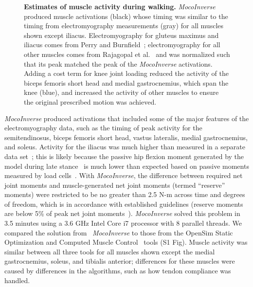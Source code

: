 \documentclass[10pt,letterpaper]{article}
\begin{document}
\begin{figure}[!h]
    \centering
    \caption{{\bf Estimates of muscle activity during walking.}
        \textit{MocoInverse} produced muscle activations (black) whose timing was similar to the timing from electromyography measurements (gray) for all muscles shown except iliacus. Electromyography for gluteus maximus and iliacus comes from Perry and Burnfield~\cite{Perry:2010}; electromyography for all other muscles comes from Rajagopal et al.~\cite{Rajagopal:2016ek} and was normalized such that its peak matched the peak of the \textit{MocoInverse} activations. Adding a cost term for knee joint loading reduced the activity of the biceps femoris short head and medial gastrocnemius, which span the knee (blue), and increased the activity of other muscles to ensure the original prescribed motion was achieved.
    }
    \label{walking}
\end{figure}

\textit{MocoInverse} produced activations that included some of the major features of the electromyography data, such as the timing of peak activity for the semitendinosus, biceps femoris short head, vastus lateralis, medial gastrocnemius, and soleus. Activity for the iliacus was much higher than measured in a separate data set~\cite{Perry:2010}; this is likely because the passive hip flexion moment generated by the model during late stance~\cite{Rajagopal:2016ek} is much lower than expected based on passive moments measured by load cells~\cite{Whittington:2008jia}. With \textit{MocoInverse}, the difference between required net joint moments and muscle-generated net joint moments (termed ``reserve'' moments) were restricted to be no greater than 2.5 N-m across time and degrees of freedom, which is in accordance with established guidelines (reserve moments are below 5\% of peak net joint moments~\cite{Hicks:2015bo}). \textit{MocoInverse} solved this problem in 3.5 minutes using a 3.6 GHz Intel Core i7 processor with 8 parallel threads. We compared the solution from ~\textit{MocoInverse} to those from the OpenSim Static Optimization and Computed Muscle Control~\cite{Thelen:2003bba} tools (S1 Fig). Muscle activity was similar between all three tools for all muscles shown except the medial gastrocnemius, soleus, and tibialis anterior; differences for these muscles were caused by differences in the algorithms, such as how tendon compliance was handled.
\end{document}
